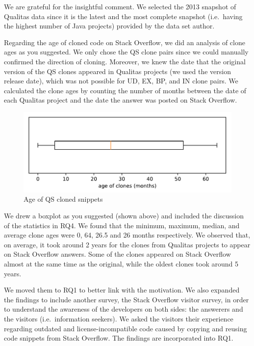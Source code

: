 \documentclass[a4paper,twoside,10pt]{reviewresponse}
\begin{document}
We are grateful for the insightful comment. We selected the 2013 snapshot of
Qualitas data since it is the latest and the most complete snapshot (i.e.~having
the highest number of Java projects) provided by the data set author.

Regarding the age of cloned code on Stack Overflow, we did an analysis of clone
ages as you suggested. We only chose the QS clone pairs since we could manually
confirmed the direction of cloning. Moreover, we knew the date that the original
version of the QS clones appeared in Qualitas projects (we used the version
release date), which was not possible for UD, EX, BP, and IN clone pairs. We
calculated the clone ages by counting the number of months between the date of
each Qualitas project and the date the answer was posted on Stack Overflow.

\begin{figure}[H] \centering
	\includegraphics[width=0.7\linewidth]{../boxplot_clone_age} \caption{Age of QS
		cloned snippets} \label{fig:boxplotcloneage} \end{figure}

We drew a boxplot as you suggested (shown above) and included the discussion of
the statistics in RQ4. We found that the minimum, maximum, median, and average
clone ages were 0, 64, 26.5 and 26 months respectively. We observed that, on
average, it took around 2 years for the clones from Qualitas projects to appear
on Stack Overflow answers. Some of the clones appeared on Stack Overflow almost
at the same time as the original, while the oldest clones took around 5 years.


We moved them to RQ1 to better link with the motivation. We also expanded the
findings to include another survey, the Stack Overflow visitor survey, in order
to understand the awareness of the developers on both sides: the answerers and
the visitors (i.e.~information seekers). We asked the visitors their experience
regarding outdated and license-incompatible code caused by copying and reusing
code snippets from Stack Overflow. The findings are incorporated into RQ1.
\end{document}
